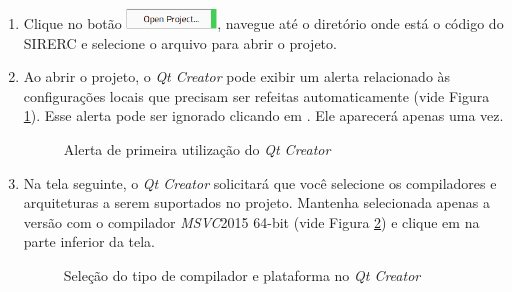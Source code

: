 \documentclass[a4paper,11pt]{article}
\newcommand{\sistema}{\textsf{SIRERC}}
\newcommand{\qtcreator}{\textit{Qt Creator}}
\newcommand{\msvc}{\textit{MSVC}}
\begin{document}
\begin{enumerate}
\begin{enumerate}
		\item Clique no botão \includegraphics[height=1.5em]{images/qtcreatoropen.png}, navegue até o diretório onde está o código do \sistema{} e selecione o arquivo  para abrir o projeto.
		
		\item Ao abrir o projeto, o \qtcreator{} pode exibir um alerta relacionado às configurações locais que precisam ser refeitas automaticamente (vide Figura \ref{fig:qtcreatoralert}). Esse alerta pode ser ignorado clicando em . Ele aparecerá apenas uma vez.
		
		\begin{figure}[H]\centering
			\caption{Alerta de primeira utilização do \qtcreator{}}\label{fig:qtcreatoralert}
		\end{figure}
		
		\item Na tela seguinte, o \qtcreator{} solicitará que você selecione os compiladores e arquiteturas a serem suportados no projeto. Mantenha selecionada apenas a versão com o compilador \msvc{}2015 64-bit (vide Figura \ref{fig:qtcreatorconf}) e clique em  na parte inferior da tela.
		
		\begin{figure}[H]\centering
			\caption{Seleção do tipo de compilador e plataforma no \qtcreator{}}\label{fig:qtcreatorconf}
		\end{figure}
	\end{enumerate}
	

\end{enumerate}
\end{document}
